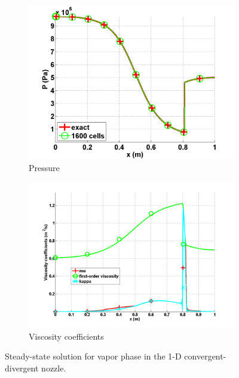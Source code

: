 \documentclass[preprint,10pt]{elsarticle}
\begin{document}
\begin{figure}[H]
        \begin{subfigure}[b]{0.495\textwidth}
                \centering
                \includegraphics[width=\textwidth]{vapor_pressure_numerical_and_exact_1600.png}
                \caption{Pressure}
                \label{fig:1d_nozzle_vap_press}
        \end{subfigure}

        \begin{subfigure}[b]{0.495\textwidth}
                \centering
                \includegraphics[width=\textwidth]{vapor_viscosity_numerical1600.png}
                \caption{Viscosity coefficients}
                \label{fig:1d_nozzle_vap_visc}
        \end{subfigure}
        \caption{Steady-state solution for vapor phase in the 1-D convergent-divergent nozzle.}
				\label{fig:1d_vap_nozzle}
\end{figure}
\end{document}

